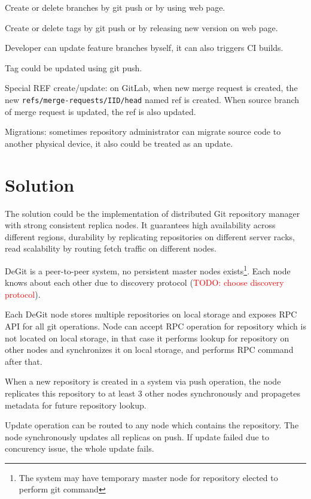 \documentclass[12pt,oneside]{article}
\newcommand{\code}[1]{\texttt{#1}}
\newcommand{\todo}[1]{\textcolor{red}{TODO: #1}}
\begin{document}
\begin{description}
  \item Create or delete branches by git push or by using web page.
  \item Create or delete tags by git push or by releasing new version on web page.
  \item Developer can update feature branches byself, it can also triggers CI builds.
  \item Tag could be updated using git push.
  \item Special REF create/update: on GitLab, when new merge request is created,
    the new \code{refs/merge-requests/IID/head} named ref
    is created. When source branch of merge request is updated, the ref is also updated.
  \item Migrations: sometimes repository administrator can migrate source code to
    another physical device, it also could be treated as an update.
\end{description}

\section{Solution}

The solution could be the implementation of distributed Git repository manager with
strong consistent replica nodes. It guarantees high availability across
different regions, durability by replicating repositories on different server racks,
read scalability by routing fetch traffic on different nodes.

DeGit is a peer-to-peer system, no persistent master nodes
exists\footnote{The system may have temporary master node for repository elected to perform git command}.
Each node knows about each other due to discovery protocol (\todo{choose discovery protocol}).

Each DeGit node stores multiple repositories on local storage
and exposes RPC API for all git operations. Node can accept RPC operation for repository
which is not located on local storage, in that case it performs lookup
for repository on other nodes and synchronizes it on local storage, and performs RPC command
after that.

When a new repository is created in a system via push operation, the node replicates this repository
to at least 3 other nodes synchronously and propagetes metadata for future repository lookup.

Update operation can be routed to any node which contains the repository. The node synchronously
updates all replicas on push. If update failed due to concurency issue, the whole update fails.
\end{document}
